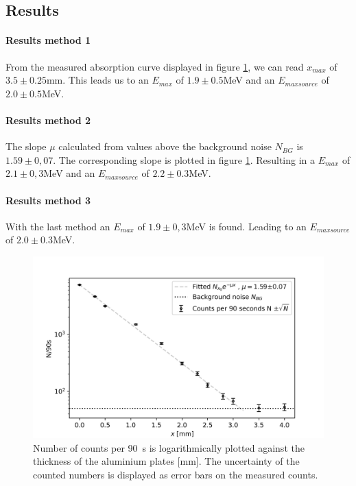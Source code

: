 \subsection{Results}
\paragraph{Results method 1}
From the measured absorption curve displayed in figure \ref{fig::absorb}, we can read $x_{max}$ of $3.5\pm 0.25$\si{\mm}.
This leads us to an $E_{max}$ of $1.9 \pm 0.5$\si{\mega\electronvolt} and an $E_{maxsource}$ of  $2.0 \pm 0.5$\si{\mega\electronvolt}.


\paragraph{Results method 2}
The slope $\mu$ calculated from values above the background noise $N_{BG}$ is $1.59\pm0,07$. The corresponding slope is plotted in figure \ref{fig::absorb}.
Resulting in a $E_{max}$ of $2.1 \pm 0,3$\si{\mega\electronvolt} and an $E_{maxsource}$ of  $2.2 \pm 0.3$\si{\mega\electronvolt}.


\paragraph{Results method 3}
With the last method an $E_{max}$ of $1.9 \pm 0,3$\si{\mega\electronvolt} is found. Leading to an $E_{maxsource}$ of  $2.0 \pm 0.3$\si{\mega\electronvolt}.

\begin{figure} [ht]
	\centering
	\includegraphics[width=400pt]{python/fit.PNG}
	\caption{Number of counts per \SI{90}{\second} is logarithmically plotted against the thickness of the aluminium plates [\si{\mm}]. The uncertainty of the counted numbers is displayed as error bars on the measured counts.}
	\label{fig::absorb}
\end{figure}